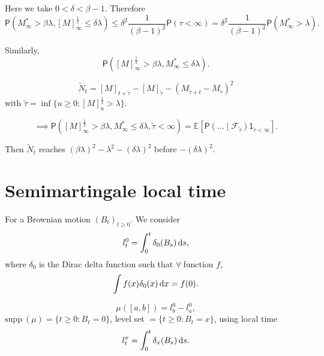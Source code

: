 {    Here we take $0 < \delta < \beta -1$. Therefore
    $$
    \mathsf{P}\left( M_\infty^* > \beta \lambda, [M]_{\infty}^{\frac{1}{2}} \leq \delta \lambda  \right) \leq \delta^2 \frac{1}{(\beta - 1)^2} \mathsf{P}(\tau < \infty) = \delta^2 \frac{1}{(\beta-1)^2} \mathsf{P}\left( M_\infty^* > \lambda \right).
    $$

    Similarly, 
    $$
    \mathsf{P}\left( [M]_{\infty}^{\frac{1}{2}} > \beta \lambda, M_{\infty}^*  \leq \delta \lambda\right).
    $$

    $$
    \tilde{N}_t = [M]_{t+\tilde{\tau}} - [M]_{\tilde{\tau}} - (M_{\tilde{\tau} + t}-M_{\tilde{\tau}})^2
    $$
    with $\tilde{\tau} = \inf\{u \geq 0 \colon [M]_{u}^{\frac{1}{2}} > \lambda\}$.

    $$
    \implies \mathsf{P}\left( [M]_{\infty}^{\frac{1}{2}} > \beta \lambda, M_{\infty}^*  \leq \delta \lambda, \tilde{\tau} < \infty \right) = \mathbb{E}\left[ \mathsf{P}(\dots \mid \mathcal{F}_{\tilde{\tau}})\mathsf{1}_{\tilde{\tau} < \infty} \right].
    $$

    Then $\tilde{N}_t$ reaches $(\beta \lambda)^2 - \lambda^2 - (\delta \lambda)^2$ before $-(\delta \lambda)^2$.

}

\section{Semimartingale local time}
For a Brownian motion $(B_t)_{t \geq 0}$. We consider
$$
l_t^0 = \int_0^t \delta_0 (B_s) \mathop{}\!\mathrm{d} s,
$$
where $\delta_0$ is the Dirac delta function such that $\forall~$function $f$,
$$
\int f(x) \delta_0(x) \mathop{}\!\mathrm{d} x = f(0).
$$

$$
\mu([a,b]) = l_b^0 - l_a^0,
$$
$\mathrm{supp}~(\mu)=\{t \geq 0 \colon B_t = 0\}$, level set $=\{t \geq 0 \colon B_t = x\}$, using local time 
$$
l_t^x = \int_0^t \delta_x (B_s) \mathop{}\!\mathrm{d} s.
$$


